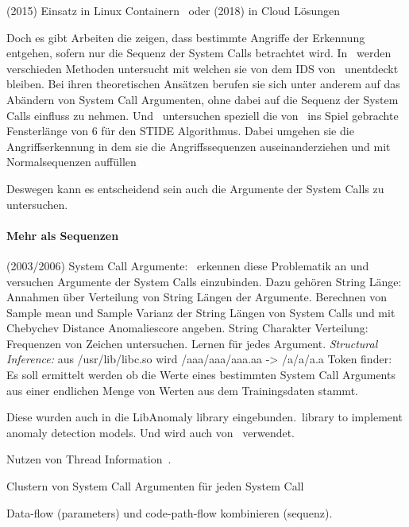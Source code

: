         (2015) Einsatz in Linux Containern~\cite{FREQUENCY1} oder (2018) in Cloud Lösungen~\cite{VM}

    Doch es gibt Arbeiten die zeigen, dass bestimmte Angriffe der Erkennung entgehen, sofern nur die Sequenz der System Calls betrachtet wird.
    In~\cite{Syscallseqexploit1} werden verschieden Methoden untersucht mit welchen sie von dem IDS von~\cite{FORREST2000} unentdeckt bleiben.
    Bei ihren theoretischen Ansätzen berufen sie sich unter anderem auf das Abändern von System Call Argumenten, ohne dabei auf die Sequenz der System Calls einfluss zu nehmen.
    Und~\cite{Syscallseqexploit3} untersuchen speziell die von~\cite{FORREST} ins Spiel gebrachte Fensterlänge von $6$ für den STIDE Algorithmus.
    Dabei umgehen sie die Angriffserkennung in dem sie die Angriffssequenzen auseinanderziehen und mit Normalsequenzen auffüllen
    

    Deswegen kann es entscheidend sein auch die Argumente der System Calls zu untersuchen.

    \paragraph{Mehr als Sequenzen}

        (2003/2006) System Call Argumente:~\cite{ARGUMENTS, ARGUMENTS2} erkennen diese Problematik an und versuchen Argumente der System Calls einzubinden.
        Dazu gehören String Länge: Annahmen über Verteilung von String Längen der Argumente. 
            Berechnen von Sample mean und Sample Varianz der String Längen von System Calls und mit Chebychev Distance Anomaliescore angeben.
        String Charakter Verteilung: Frequenzen von Zeichen untersuchen. Lernen für jedes Argument.
        \textit{Structural Inference:} aus /usr/lib/libc.so wird /aaa/aaa/aaa.aa -> /a/a/a.a  
        Token finder: Es soll ermittelt werden ob die Werte eines bestimmten System Call Arguments aus einer endlichen Menge von Werten aus dem Trainingsdaten stammt.
        
        Diese wurden auch in die LibAnomaly library eingebunden.\
        library to implement anomaly detection models.
        Und wird auch von~\cite{MAGGI} verwendet.

        Nutzen von Thread Information~\cite{IDSTHREADGRIMMER2021}.

        Clustern von System Call Argumenten für jeden System Call~\cite{}

        Data-flow (parameters) und code-path-flow kombinieren (sequenz).


